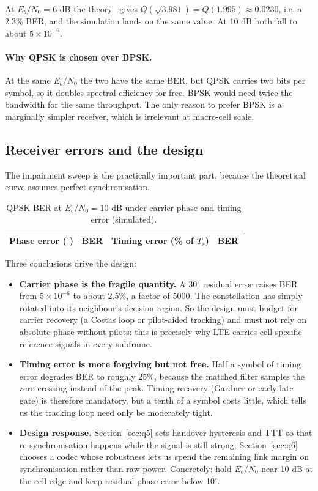 \documentclass[9pt,a4paper]{article}
\begin{document}
At $E_b/N_0=6$ dB the theory~\cite{berawgn} gives $Q(\sqrt{3.981})=Q(1.995)\approx0.0230$, i.e. a 2.3\% BER, and
the simulation lands on the same value. At 10 dB both fall to about $5\times10^{-6}$.

\paragraph{Why QPSK is chosen over BPSK.} At the same $E_b/N_0$ the two have the same BER, but
QPSK carries two bits per symbol, so it doubles spectral efficiency for free. BPSK would need
twice the bandwidth for the same throughput. The only reason to prefer BPSK is a marginally
simpler receiver, which is irrelevant at macro-cell scale.

\subsection{Receiver errors and the design}
The impairment sweep is the practically important part, because the theoretical curve assumes
perfect synchronisation.

\begin{table}[H]\centering\small
\caption{QPSK BER at $E_b/N_0=10$ dB under carrier-phase and timing error (simulated).}
\label{tab:impair}
\begin{tabular}{@{}cccc@{}}
\toprule
Phase error ($^\circ$) & BER & Timing error (\% of $T_s$) & BER \\
\midrule
\bottomrule
\end{tabular}
\end{table}

Three conclusions drive the design:

\begin{itemize}[leftmargin=1.4em,itemsep=1pt,topsep=2pt]
\item \textbf{Carrier phase is the fragile quantity.} A 30$^\circ$ residual error raises BER from
$5\times10^{-6}$ to about 2.5\%, a factor of 5000. The constellation has simply rotated into
its neighbour's decision region. So the design must budget for carrier recovery (a Costas loop or
pilot-aided tracking) and must not rely on absolute phase without pilots: this is precisely why
LTE carries cell-specific reference signals in every subframe.
\item \textbf{Timing error is more forgiving but not free.} Half a symbol of timing error
degrades BER to roughly 25\%, because the matched filter samples the zero-crossing instead of the
peak. Timing recovery (Gardner or early-late gate) is therefore mandatory, but a tenth of a
symbol costs little, which tells us the tracking loop need only be moderately tight.
\item \textbf{Design response.} Section~\ref{sec:q5} sets handover hysteresis and TTT so that
re-synchronisation happens while the signal is still strong; Section~\ref{sec:q6} chooses a codec
whose robustness lets us spend the remaining link margin on synchronisation rather than raw power.
Concretely: hold $E_b/N_0$ near 10 dB at the cell edge and keep residual phase error below
10$^\circ$.
\end{itemize}
\end{document}
